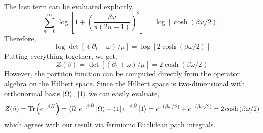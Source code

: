 \documentclass[12pt]{article}
\begin{document}
The last term can be evaluated explicitly,
\[ \sum_{n = 0}^\infty \log{\left[ 1 + \left( \frac{\beta \omega}{\pi (2 n + 1)} \right)^2 \right]} = \log{\left[ \cosh{(\beta \omega / 2)} \right] } \]
Therefore,
\[ \log{\det{\left[ \left( \partial_t + \omega \right) / \mu \right]}} = \log{\left[ 2 \cosh{(\beta \omega / 2)} \right] } \]
Putting everything together, we get,
\[ Z(\beta) = \det{\left[ \left( \partial_t + \omega \right) / \mu \right]} = 2 \cosh{(\beta \omega / 2)} \]
However, the partiton function can be computed directly from the operator algebra on the Hilbert space. Since the Hilbert space is two-dimensional with orthonormal basis $\left| \Omega \right>$, $\left| 1 \right>$  we can easily evaluate,
\begin{align*}
Z(\beta) = \mathrm{Tr}\left( e^{- \beta \hat{H} } \right) = \left< \Omega \right| e^{ - \beta \hat{H} } \left| \Omega \right> + \left< 1 \right| e^{ - \beta \hat{H} } \left| 1 \right> = e^{+ (\beta \omega / 2)} + e^{- ( \beta \omega / 2)} = 2 \cosh{(\beta \omega / 2)} 
\end{align*}
which agrees with our result via fermionic Euclidean path integrals. 
\end{document}
